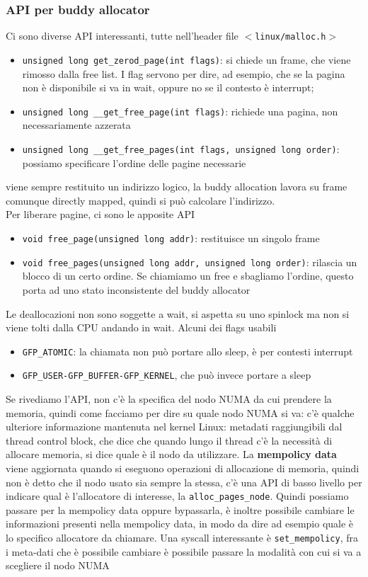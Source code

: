 \documentclass[12pt, oneside]{extbook}
\begin{document}
\subsubsection{API per buddy allocator}
Ci sono diverse API interessanti, tutte nell'header file \texttt{$<$linux/malloc.h$>$}
\begin{itemize}
\item \texttt{unsigned long get\_zerod\_page(int flags)}: si chiede un frame, che viene rimosso dalla free list. I flag servono per dire, ad esempio, che se la pagina non è disponibile si va in wait, oppure no se il contesto è interrupt;
\item \texttt{unsigned long \_\_get\_free\_page(int flags)}: richiede una pagina, non necessariamente azzerata
\item \texttt{unsigned long \_\_get\_free\_pages(int flags, unsigned long order)}: possiamo specificare l'ordine delle pagine necessarie
\end{itemize}
viene sempre restituito un indirizzo logico, la buddy allocation lavora su frame comunque directly mapped, quindi si può calcolare l'indirizzo.\\ Per liberare pagine, ci sono le apposite API
\begin{itemize}
\item \texttt{void free\_page(unsigned long addr)}: restituisce un singolo frame
\item \texttt{void free\_pages(unsigned long addr, unsigned long order)}: rilascia un blocco di un certo ordine. Se chiamiamo un free e sbagliamo l'ordine, questo porta ad uno stato inconsistente del buddy allocator
\end{itemize}
Le deallocazioni non sono soggette a wait, si aspetta su uno spinlock ma non si viene tolti dalla CPU andando in wait. Alcuni dei flags usabili
\begin{itemize}
\item \texttt{GFP\_ATOMIC}: la chiamata non può portare allo sleep, è per contesti interrupt
\item \texttt{GFP\_USER-GFP\_BUFFER-GFP\_KERNEL}, che può invece portare a sleep
\end{itemize}
Se rivediamo l'API, non c'è la specifica del nodo NUMA da cui prendere la memoria, quindi come facciamo per dire su quale nodo NUMA si va: c'è qualche ulteriore informazione mantenuta nel kernel Linux: metadati raggiungibili dal thread control block, che dice che quando lungo il thread c'è la necessità di allocare memoria, si dice quale è il nodo da utilizzare. La \textbf{mempolicy data} viene aggiornata quando si eseguono operazioni di allocazione di memoria, quindi non è detto che il nodo usato sia sempre la stessa, c'è una API di basso livello per indicare qual è l'allocatore di interesse, la \texttt{alloc\_pages\_node}. Quindi possiamo passare per la mempolicy data oppure bypassarla, è inoltre possibile cambiare le informazioni presenti nella mempolicy data, in modo da dire ad esempio quale è lo specifico allocatore da chiamare. Una syscall interessante è \texttt{set\_mempolicy}, fra i meta-dati che è possibile cambiare è possibile passare la modalità con cui si va a scegliere il nodo NUMA
\end{document}
